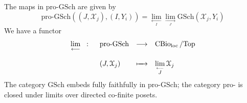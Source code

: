 \documentclass[leqno]{article}
\renewcommand{\top}{\text{Top}}
\newcommand{\xspace}{\mathcal{X}}
\DeclareMathOperator{\cbio}{CBio}
\numberwithin{equation}{section}
\begin{document}
The maps in pro-$\text{GSch}$ are given by
\begin{equation}
				\text{pro-GSch}\left( (J,\xspace_{j}), (I,Y_{i}) \right)=
				\lim\limits_{\underset{I}{\leftarrow}}\lim\limits_{\underset{J}{\rightarrow}}
				\text{GSch}\left( \xspace_{j},Y_{i} \right)
				\label{eq:8.6}
\end{equation}
We have a functor 
\begin{equation}
				\begin{array}[H]{llll}
								\lim\limits_{\longleftarrow}\;\; : \;\; & \text{pro-GSch}&\longrightarrow&
								\cbio_{\text{loc}}/\top \\\\
								\ & (J,\xspace_{j})&\xmapsto{\quad}&
								\lim\limits_{\overset{\longleftarrow}{J}}\xspace_{j}
				\end{array}
				\label{eq:8.7}
\end{equation}
The category $\text{GSch}$ embeds fully faithfully in pro-$\text{GSch}$; the category
pro- is closed under limits over directed co-finite posets. 
\end{document}
